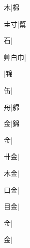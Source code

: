 \begin{multicols}{2}
{{\cjk{}{\cnsym{}　}{\cnsym{}　}木}|{\cjk{}棉}\par
{\cjk{}{\cnsym{}　}圭寸}|{\cjk{}幫}\par
{\cjk{}{\cnsym{}　}{\cnsym{}　}石}|{}\par
{\cjk{}艸白巾}|{}\par
{}|{\cjk{}锦}\par
{\cjk{}{\cnsym{}　}{\cnsym{}　}缶}|{}\par
{\cjk{}{\cnsym{}　}{\cnsym{}　}舟}|{\cjk{}艊}\par
{\cjk{}{\cnsym{}　}{\cnsym{}　}金}|{\cjk{}錦}\par
{金}|{}\par
{\cjk{}{\cnsym{}　}卄金}|{}\par
{\cjk{}{\cnsym{}　}木金}|{}\par
{\cjk{}{\cnsym{}　}口金}|{}\par
{\cjk{}{\cnsym{}　}目金}|{}\par
{金}|{}\par
{金}|{}\par
}
\end{multicols}
